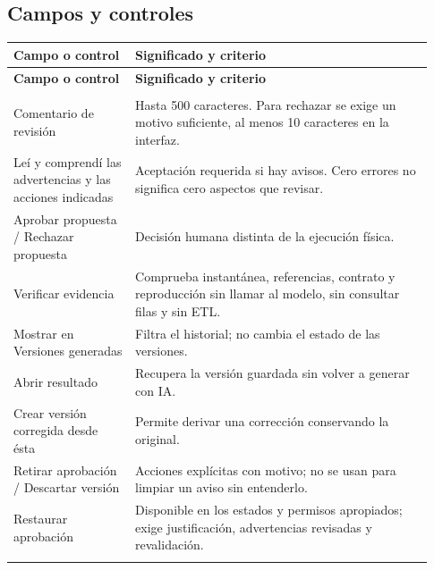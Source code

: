 \subsection{Campos y controles}
\begingroup
\fontsize{10}{12.5}\selectfont
\setlength{\tabcolsep}{5pt}
\renewcommand{\arraystretch}{1.15}
\begin{longtable}{@{}>{\RaggedRight\arraybackslash}p{0.27\linewidth}>{\RaggedRight\arraybackslash}p{0.66\linewidth}@{}}
\toprule
\textbf{Campo o control} & \textbf{Significado y criterio} \\
\midrule
\endfirsthead
\toprule
\textbf{Campo o control} & \textbf{Significado y criterio} \\
\midrule
\endhead
\midrule
\multicolumn{2}{r}{\footnotesize Continúa en la página siguiente}\\
\endfoot
\bottomrule
\endlastfoot
Comentario de revisión & Hasta 500 caracteres. Para rechazar se exige un motivo suficiente, al menos 10 caracteres en la interfaz. \\
\addlinespace[3pt]
Leí y comprendí las advertencias y las acciones indicadas & Aceptación requerida si hay avisos. Cero errores no significa cero aspectos que revisar. \\
\addlinespace[3pt]
Aprobar propuesta / Rechazar propuesta & Decisión humana distinta de la ejecución física. \\
\addlinespace[3pt]
Verificar evidencia & Comprueba instantánea, referencias, contrato y reproducción sin llamar al modelo, sin consultar filas y sin ETL. \\
\addlinespace[3pt]
Mostrar en Versiones generadas & Filtra el historial; no cambia el estado de las versiones. \\
\addlinespace[3pt]
Abrir resultado & Recupera la versión guardada sin volver a generar con IA. \\
\addlinespace[3pt]
Crear versión corregida desde ésta & Permite derivar una corrección conservando la original. \\
\addlinespace[3pt]
Retirar aprobación / Descartar versión & Acciones explícitas con motivo; no se usan para limpiar un aviso sin entenderlo. \\
\addlinespace[3pt]
Restaurar aprobación & Disponible en los estados y permisos apropiados; exige justificación, advertencias revisadas y revalidación. \\
\addlinespace[3pt]
\end{longtable}
\endgroup

